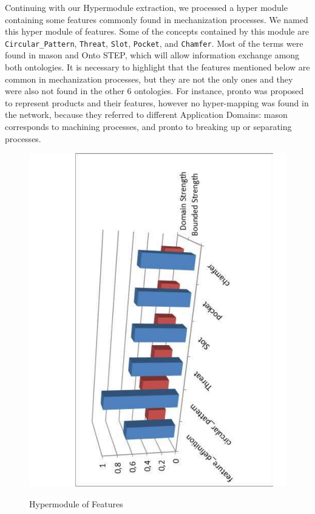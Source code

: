 Continuing with our Hypermodule extraction, we processed a hyper module containing some features commonly found in mechanization processes. We named this hyper module of features. Some of the concepts contained by this module are \texttt{Circular\_Pattern}, \texttt{Threat}, \texttt{Slot}, \texttt{Pocket}, and \texttt{Chamfer}. Most of the terms were found in \gls{mason} and Onto STEP, which will allow information exchange among both ontologies. It is necessary to highlight that the features mentioned below are common in mechanization processes, but they are not the only ones and they were also not found in the other 6 ontologies. For instance, \gls{pronto} was proposed to represent products and their features, however no hyper-mapping was found in the network, because   they referred to different Application Domains: \gls{mason} corresponds to machining processes, and \gls{pronto} to breaking up or separating processes.


\begin{figure}
\begin{center}
	\includegraphics[scale=0.5, angle=-90]{figure-chapterIV/fig4-22.pdf}\\
	\caption{Hypermodule of Features}
	\label{figure4-22}
\end{center}
\end{figure}


